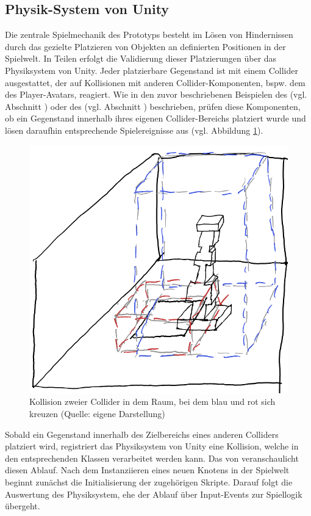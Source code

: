 \subsection{Physik-System von Unity}\label{sec:unity-physics-system}

Die zentrale Spielmechanik des Prototyps besteht im Lösen von Hindernissen durch das gezielte Platzieren von Objekten an definierten Positionen in der Spielwelt. In Teilen erfolgt die Validierung dieser Platzierungen über das Physiksystem von Unity. Jeder platzierbare Gegenstand ist mit einem Collider ausgestattet, der auf Kollisionen mit anderen Collider-Komponenten, bspw. dem des Player-Avatars, reagiert. Wie in den zuvor beschriebenen Beispielen des  (vgl. Abschnitt ) oder des  (vgl. Abschnitt ) beschrieben, prüfen diese Komponenten, ob ein Gegenstand innerhalb ihres eigenen Collider-Bereichs platziert wurde und lösen daraufhin entsprechende Spielereignisse aus (vgl. Abbildung \ref{fig:collision-sketch}). 

\begin{figure}[ht]
\centering
\includegraphics[width=.6\linewidth]{content/pictures/CollisionSketch.png}
\caption{Kollision zweier Collider in dem Raum, bei dem blau und rot sich kreuzen (Quelle: eigene Darstellung)}
\label{fig:collision-sketch}
\end{figure}

Sobald ein Gegenstand innerhalb des Zielbereichs eines anderen Colliders platziert wird, registriert das Physiksystem von Unity eine Kollision, welche in den entsprechenden Klassen verarbeitet werden kann. Das  von \cite{technologies_unity_2019} veranschaulicht diesen Ablauf. Nach dem Instanziieren eines neuen Knotens in der Spielwelt beginnt zunächst die Initialisierung der zugehörigen Skripte. Darauf folgt die Auswertung des Physiksystem, ehe der Ablauf über Input-Events zur Spiellogik übergeht.

